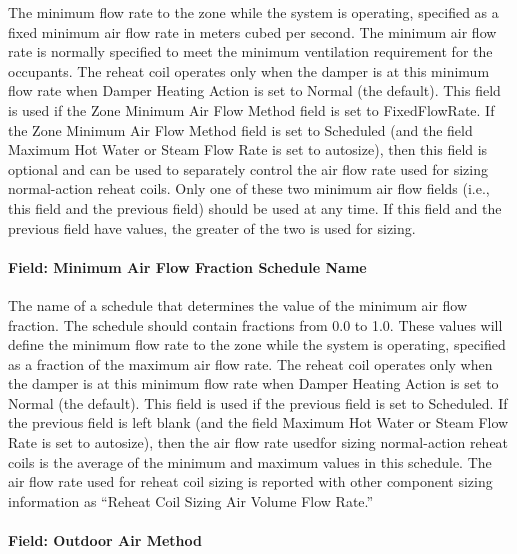 The minimum flow rate to the zone while the system is operating, specified as a fixed minimum air flow rate in meters cubed per second. The minimum air flow rate is normally specified to meet the minimum ventilation requirement for the occupants. The reheat coil operates only when the damper is at this minimum flow rate when Damper Heating Action is set to Normal (the default). This field is used if the Zone Minimum Air Flow Method field is set to FixedFlowRate. If the Zone Minimum Air Flow Method field is set to Scheduled (and the field Maximum Hot Water or Steam Flow Rate is set to autosize), then this field is optional and can be used to separately control the air flow rate used for sizing normal-action reheat coils. Only one of these two minimum air flow fields (i.e., this field and the previous field) should be used at any time. If this field and the previous field have values, the greater of the two is used for sizing.

\paragraph{Field: Minimum Air Flow Fraction Schedule Name}\label{field-minimum-air-flow-fraction-schedule-name-000}

The name of a schedule that determines the value of the minimum air flow fraction. The schedule should contain fractions from 0.0 to 1.0. These values will define the minimum flow rate to the zone while the system is operating, specified as a fraction of the maximum air flow rate. The reheat coil operates only when the damper is at this minimum flow rate when Damper Heating Action is set to Normal (the default). This field is used if the previous field is set to Scheduled. If the previous field is left blank (and the field Maximum Hot Water or Steam Flow Rate is set to autosize), then the air flow rate usedfor sizing normal-action reheat coils is the average of the minimum and maximum values in this schedule. The air flow rate used for reheat coil sizing is reported with other component sizing information as ``Reheat Coil Sizing Air Volume Flow Rate.''

\paragraph{Field: Outdoor Air Method}\label{field-outdoor-air-method-8}

